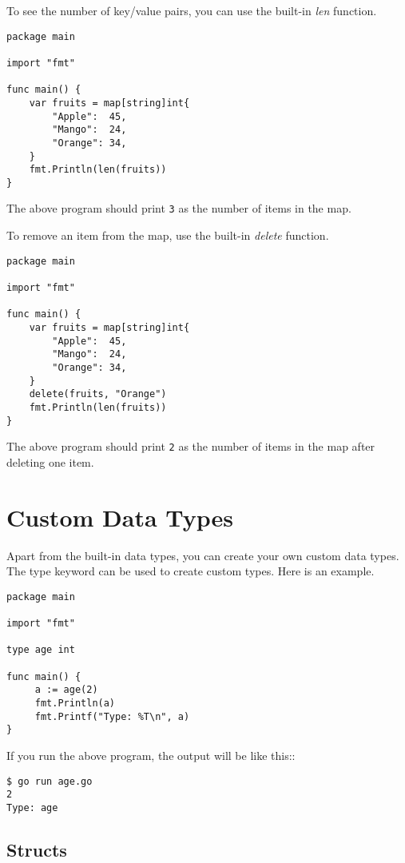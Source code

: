 To see the number of key/value pairs, you can use the built-in \textit{len}
function.

\begin{lstlisting}[numbers=none]
package main

import "fmt"

func main() {
	var fruits = map[string]int{
		"Apple":  45,
		"Mango":  24,
		"Orange": 34,
	}
	fmt.Println(len(fruits))
}
\end{lstlisting}

The above program should print \texttt{3} as the number of items in the map.

To remove an item from the map, use the built-in \textit{delete} function.

\begin{lstlisting}[numbers=none]
package main

import "fmt"

func main() {
	var fruits = map[string]int{
		"Apple":  45,
		"Mango":  24,
		"Orange": 34,
	}
	delete(fruits, "Orange")
	fmt.Println(len(fruits))
}
\end{lstlisting}

The above program should print \texttt{2} as the number of items in the map
after deleting one item.

\section{Custom Data Types}

Apart from the built-in data types, you can create your own custom
data types.  The type keyword
can be used to create custom types.  Here is an example.

\begin{lstlisting}[numbers=none]
package main

import "fmt"

type age int

func main() {
     a := age(2)
     fmt.Println(a)
     fmt.Printf("Type: %T\n", a)
}
\end{lstlisting}

If you run the above program, the output will be like this::

\begin{lstlisting}[numbers=none]
$ go run age.go
2
Type: age
\end{lstlisting}

\subsection{Structs}


